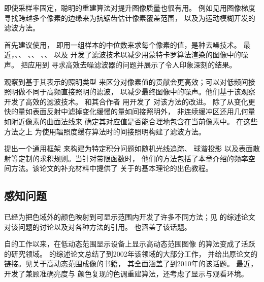 即使采样率固定，聪明的重建算法对提升图像质量也很有用。
例如见\citet{10.1145/1572769.1572787}用图像梯度
寻找跨越多个像素的边缘来为抗锯齿估计像素覆盖范围，
以及\citet{Guertin2014MotionBlur}为运动模糊开发的滤波方法。

\citet{55149}首先建议使用，
即用一组样本的中位数来求每个像素的值，是种去噪技术。
最近，\citet{10.1145/2010324.1964950}、\citet{10.1145/2185520.2185547}、
\citet{10.1111/cgf.12029}、\citet{10.1145/2366145.2366214}、
\citet{10.1111/cgf.12219}、\citet{10.1145/2532708}、
\citet{10.1111/cgf.12415}以及\citet{10.1111/cgf.12587}
开发了滤波技术以减少用蒙特卡罗算法渲染的图像中的噪声。
\citet{10.1145/2766977}把应用到
寻求高效去噪滤波器的问题并展示了令人印象深刻的结果。

\citet{jensen1995optimizing}观察到基于其表示的照明类型
来区分对像素值的贡献会更高效；可以对低频间接照明做不同于高频直接照明的滤波，
以减少最终图像中的噪声。他们基于该观察开发了高效的滤波技术。
\citeauthor{keller1998quasi}和其合作者
用开发了
对该方法的改进\citep{keller1998quasi,10.2312:EGWR:EGWR02:015-024}。
除了从变化更快的量如表面反射中滤掉变化缓慢的量如间接照明外，
非连续缓冲区还用几何量如附近像素的曲面法线来
确定其对应值是否能合理地包含在当前像素中。
\citet{10.1007/3-540-31186-6_16}在这些方法之上
为使用辐照度缓存算法时的间接照明构建了滤波方法。

\citet{10.1145/2601097.2601149}提出一个通用框架
来构建为特定积分问题如随机光线追踪、
球谐投影
以及表面散射等定制的求积规则。当针对带限函数时，
他们的方法包括了本章介绍的频率空间方法。该论文的补充材料中提供了
关于的基本理论的出色教程。

\subsection{感知问题}\label{sub:感知问题}
已经为把色域外的颜色映射到可显示范围内开发了许多不同方法；见
\citet{10.1111/1467-8659.00212}的综述论文
对该问题的讨论以及对各种方法的引用。
\citet{10.1007/978-1-4612-3526-2}也涵盖了该话题。

自\citet{252554}的工作以来，在低动态范围显示设备上显示高动态范围图像
的算法变成了活跃的研究领域。
\citet{10.2312:egst.20021054}的综述论文总结了到2002年该领域的大部分工作，
并给出原论文的链接。见\citet{reinhard2010high}关于高动态范围成像的书籍，
其全面涵盖了到2010年的该话题。
最近，\citet{10.1145/2366145.2366220}开发了兼顾准确亮度与
颜色复现的色调重建算法，还考虑了显示与观看环境。

